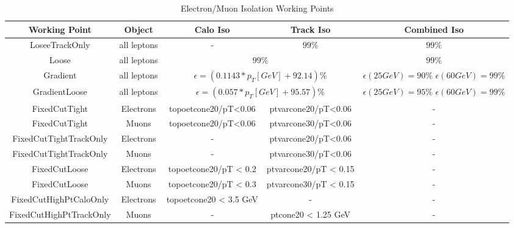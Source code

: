 \begin{table}[h]
	\caption{Electron/Muon Isolation Working Points}
	\renewcommand{\arraystretch}{1.5}
	\centering
	\begin{adjustbox}{center}
		\begin{tabular}{|c | c | c | c | c |}
			\hline
			\hline
			{\bf Working Point} &{\bf Object} &{\bf Calo Iso}                   &{\bf Track Iso}  &{Combined Iso} \\
			\hline
			LoseeTrackOnly      &all leptons  &-                                      &$99\%$                 &$99\%$               \\
			\hline
			Loose               &all leptons  &\multicolumn{2}{|c|}{$99\%$}                                   &$99\%$               \\
			\hline
			Gradient            &all leptons  &\multicolumn{2}{|c|}{$\epsilon=(0.1143*p_{T}[GeV]+92.14)\%$}   & \shortstack{\footnotesize{$\epsilon(25GeV)=90\%$} \\  \footnotesize{$\epsilon(60GeV)=99\%$}}\\       
			\hline
			GradientLoose       &all leptons  &\multicolumn{2}{|c|}{$\epsilon=(0.057*p_{T}[GeV]+95.57)\%$}   & \shortstack{\footnotesize{$\epsilon(25GeV)=95\%$} \\  \footnotesize{$\epsilon(60GeV)=99\%$}}\\
			\hline
			FixedCutTight       &Electrons  &\footnotesize{topoetcone20/pT<0.06}                 &\footnotesize{ptvarcone20/pT<0.06}  &-               \\
			\hline
			FixedCutTight       &Muons  &\footnotesize{topoetcone20/pT<0.06}                 &\footnotesize{ptvarcone30/pT<0.06}  &-               \\
			\hline
			\footnotesize{FixedCutTightTrackOnly}      &Electrons     &-                 &\footnotesize{ptvarcone20/pT<0.06}  &-               \\
			\hline
			\footnotesize{FixedCutTightTrackOnly}      &Muons      &-                 & \footnotesize{ptvarcone30/pT<0.06}  &-               \\
			\hline
			FixedCutLoose        &Electrons  & \footnotesize{topoetcone20/pT < 0.2} & \footnotesize{ptvarcone20/pT < 0.15}  & - \\
			\hline
			FixedCutLoose        &Muons  & \footnotesize{topoetcone20/pT < 0.3} & \footnotesize{ptvarcone30/pT < 0.15}  & - \\
			\hline
			\footnotesize{FixedCutHighPtCaloOnly} & Electrons &  \footnotesize{topoetcone20} < 3.5 GeV & - &-\\
			\hline
			\footnotesize{FixedCutHighPtTrackOnly} & Muons &  - &  \footnotesize{ptcone20} < 1.25 GeV  &-\\
			\hline
		\end{tabular}
	\end{adjustbox}
	\label{Tab:iso}
\end{table}
